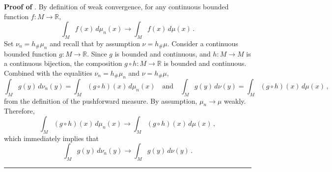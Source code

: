 \documentclass[12pt]{article}
\newcommand{\BlackBox}{\rule{1.5ex}{1.5ex}}  %
\begin{document}
\vspace{0.5em}
\noindent
{\bf Proof of }. By definition of weak convergence, for any continuous bounded function $f:M \rightarrow \mathbb{R}$,
\begin{equation*}
    \int_M f(x) \,d\mu_{n}(x) \rightarrow \int_M f(x) \,d\mu(x) \,.
\end{equation*}
Set $\nu_n = h_{\#}\mu_n$ and recall that by assumption $\nu = h_{\#}\mu$. Consider a continuous bounded function $g : M \rightarrow \mathbb{R}$. Since $g$ is bounded and continuous, and $h:M \rightarrow M$ is a continuous bijection, the composition $g \circ h: M \rightarrow \mathbb{R}$ is bounded and continuous. Combined with the equalities $\nu_n = h_{\#}\mu_n$ and $\nu = h_{\#}\mu$,
\begin{equation*}
    \int_M g(y) \,d\nu_{n}(y) = \int_M ( g \circ h )(x) \,d\mu_{n}(x) \hspace{1em} \text{and} \hspace{1em} \int_M g(y) \,d\nu(y) = \int_M ( g \circ h )(x) \,d\mu(x) \, ,
\end{equation*}
from the definition of the pushforward measure. By assumption, $\mu_n \rightarrow \mu$ weakly. Therefore,
\begin{equation*}
    \int_M ( g \circ h )(x) \,d\mu_{n}(x) \rightarrow \int_M ( g \circ h )(x) \,d\mu(x) \, ,
\end{equation*}
which immediately implies that
\begin{equation*}
    \int_M g(y) \,d\nu_{n}(y) \rightarrow \int_M g(y) \,d\nu(y) \, .
\end{equation*}
\hfill\BlackBox
\end{document}

